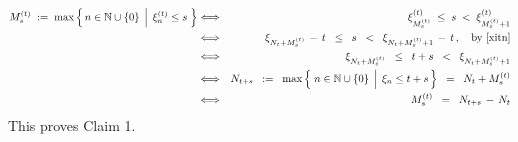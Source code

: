 \begin{eqnarray*}
M^{(t)}_{s} \; := \; \max\left\{\,n\in\N\cup\{0\}\;\left\vert\;\,\xi^{(t)}_{n} \leq s\right.\,\right\}
& \Longleftrightarrow &
	\xi^{(t)}_{M^{(t)}_{s}} \;\leq\; s \;<\; \xi^{(t)}_{M^{(t)}_{s}+1}
\\
& \Longleftrightarrow &
	\xi_{N_{t}+M^{(t)}_{s}} \,-\, t \;\;\leq\;\; s \;\;<\;\; \xi_{N_{t}+M^{(t)}_{s}+1} \,-\, t\,,
	\quad
	\textnormal{by \eqref{xitn}}
\\
& \Longleftrightarrow &
	\xi_{N_{t}+M^{(t)}_{s}} \;\;\leq\;\; t + s \;\;<\;\; \xi_{N_{t}+M^{(t)}_{s}+1}
\\
& \Longleftrightarrow &
	N_{t+s}
	\;\; := \;\;
		\max\left\{\,\left.\overset{{\color{white}1}}{n}\in\N\cup\{0\}\,\;\right\vert\;\xi_{n} \leq t+s \,\right\}
	\;\; = \;\;
		N_{t} + M^{(t)}_{s}
\\
& \Longleftrightarrow &
	M^{(t)}_{s}
	\;\; = \;\;
		N_{t+s} \, - \,N_{t}
\end{eqnarray*}
This proves Claim 1.

